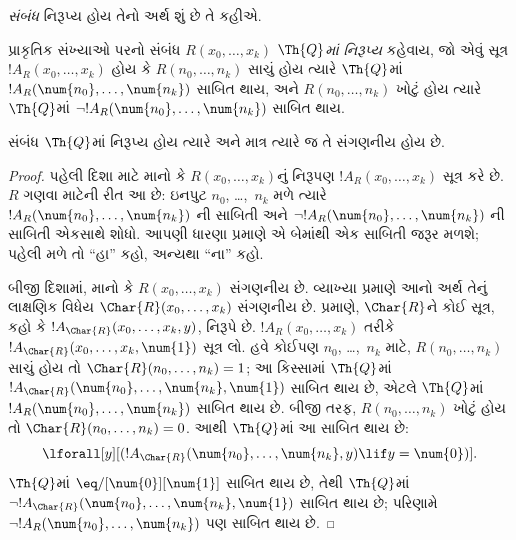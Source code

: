 \begingroup
\makeatletter{}\makeatother


\label{guunit:OLP-0298}


\emph{સંબંધ} નિરૂપ્ય હોય તેનો
અર્થ શું છે તે કહીએ.

\begin{defn}
પ્રાકૃતિક સંખ્યાઓ પરનો સંબંધ
$R(x_0,\dots,x_k)$ {\em
$\Th{Q}$માં નિરૂપ્ય} કહેવાય,
જો એવું સૂત્ર $!A_R(x_0,\dots,x_k)$
હોય કે $R(n_0,\dots,n_k)$
સાચું હોય ત્યારે
$\Th{Q}$માં
$!A_R(\num{n_0},\dots,\num{n_k})$
સાબિત થાય, અને
$R(n_0,\dots,n_k)$ ખોટું હોય
ત્યારે $\Th{Q}$માં
$\lnot !A_R(\num{n_0},
\dots, \num{n_k})$ સાબિત થાય.
\end{defn}

\begin{thm}
સંબંધ $\Th{Q}$માં નિરૂપ્ય
હોય ત્યારે અને માત્ર ત્યારે જ
તે સંગણનીય હોય છે.
\end{thm}

\begin{proof}
પહેલી દિશા માટે માનો કે
$R(x_0,\dots,x_k)$નું નિરૂપણ
$!A_R(x_0,\dots,x_k)$ સૂત્ર
કરે છે. $R$ ગણવા માટેની
રીત આ છે: ઇનપુટ
$n_0$, \dots,~$n_k$ મળે ત્યારે
$!A_R(\num{n_0}, \dots, \num{n_k})$
ની સાબિતી અને
$\lnot !A_R(\num{n_0}, \dots, \num{n_k})$
ની સાબિતી એકસાથે શોધો.
આપણી ધારણા પ્રમાણે એ બેમાંથી
એક સાબિતી જરૂર મળશે; પહેલી
મળે તો ``હા'' કહો, અન્યથા
``ના'' કહો.

બીજી દિશામાં, માનો કે
$R(x_0, \dots, x_k)$ સંગણનીય
છે. વ્યાખ્યા પ્રમાણે આનો અર્થ
તેનું લાક્ષણિક વિધેય
$\Char{R}(x_0, \dots, x_k)$
સંગણનીય છે. 
પ્રમાણે, $\Char{R}$ને કોઈ
સૂત્ર, કહો કે
$!A_{\Char{R}}(x_0, \dots, x_k,
y)$, નિરૂપે છે.
$!A_R(x_0, \dots, x_k)$ તરીકે
$!A_{\Char{R}}(x_0,
\dots, x_k, \num{1})$ સૂત્ર
લો. હવે કોઈપણ $n_0$,
\dots,~$n_k$ માટે,
$R(n_0, \dots, n_k)$ સાચું
હોય તો $\Char{R}(n_0, \dots,
n_k) = 1$; આ કિસ્સામાં
$\Th{Q}$માં
$!A_{\Char{R}}(\num{n_0}, \dots, \num{n_k},
\num{1})$ સાબિત થાય છે,
એટલે $\Th{Q}$માં
$!A_R(\num{n_0}, \dots,
\num{n_k})$ સાબિત થાય છે.
બીજી તરફ, $R(n_0, \dots,
n_k)$ ખોટું હોય તો
$\Char{R}(n_0, \dots, n_k) = 0$.
આથી $\Th{Q}$માં આ સાબિત થાય છે:
\[
\lforall[y][(!A_{\Char{R}}(\num{n_0}, \dots, \num{n_k}, y) \lif y =
  \num{0})].
\]
$\Th{Q}$માં
$\eq/[\num{0}][\num{1}]$
સાબિત થાય છે, તેથી
$\Th{Q}$માં
$\lnot !A_{\Char{R}}(\num{n_0}, \dots, \num{n_k}, \num{1})$
સાબિત થાય છે; પરિણામે
$\lnot !A_R(\num{n_0}, \dots, \num{n_k})$
પણ સાબિત થાય છે.
\end{proof}


